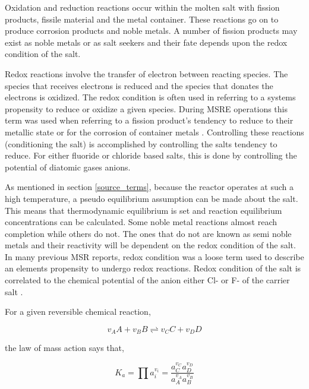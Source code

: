 Oxidation and reduction reactions occur within the molten salt with fission products, fissile material and the metal container. These reactions go on to produce corrosion products and noble metals. A number of fission products may exist as noble metals or as salt seekers and their fate depends upon the redox condition of the salt. 

Redox reactions involve the transfer of electron between reacting species. The species that receives electrons is reduced and the species that donates the electrons is oxidized. The redox condition is often used in referring to a systems propensity to reduce or oxidize a given species. During MSRE operations this term was used when referring to a fission product's tendency to reduce to their metallic state or for the corrosion of container metals \cite{olander2002}. Controlling these reactions (conditioning the salt) is accomplished by controlling the salts tendency to reduce. For either fluoride or chloride based salts, this is done by controlling the potential of diatomic gases anions. 

As mentioned in section \ref{source_terms}, because the reactor operates at such a high temperature, a pseudo equilibrium assumption can be made about the salt. This means that thermodynamic equilibrium is set and reaction equilibrium concentrations can be calculated. Some noble metal reactions almost reach completion while others do not. The ones that do not are known as semi noble metals and their reactivity will be dependent on the redox condition of the salt. In many previous MSR reports, redox condition was a loose term used to describe an elements propensity to undergo redox reactions. Redox condition of the salt is correlated to the chemical potential of the anion either Cl- or F- of the carrier salt \cite{olander2002}.  

For a given reversible chemical reaction,

 \begin{equation}
	v_{A}A + v_{B}B \rightleftharpoons v_{C}C + v_{D}D
	\label{eq:gen_chem_rxn}
\end{equation}

the law of mass action says that,

 \begin{equation}
	K_{a} = \prod a_{i}^{v_{i}} = \frac{a_{C}^{v_{C}}a_{D}^{v_{D}}}{a_{A}^{v_{A}}a_{B}^{v_{B}}}
	\label{eq:mass_action}
\end{equation}

